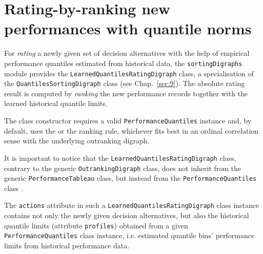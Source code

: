 \section{Rating-by-ranking new performances with quantile norms}
\label{sec:10.3}

For \emph{rating} a newly given set of decision alternatives with the help of empirical performance quantiles estimated from historical data, the \texttt{sortingDigraphs} module provides the \texttt{Learned\-QuantilesRatingDigraph} class, a specialisation of the \texttt{QuantilesSor\-tingDigraph} class (see Chap.~\ref{sec:9}). The absolute rating result is computed by \emph{ranking} the new performance records together with the learned historical quantile limits.

The class constructor requires a valid \texttt{PerformanceQuantiles} instance and, by default, uses the \Copeland or the \NetFlows ranking rule, whichever fits best in an ordinal correlation sense with the underlying outranking digraph.

It is important to notice that the \texttt{LearnedQuantilesRatingDigraph} class, contrary to the generic \texttt{OutrankingDigraph} class, does not inherit from the generic \texttt{PerformanceTableau} class, but instead from the \texttt{Performance\-Quantiles} class \citep{BIS-2021b}.

The \texttt{actions} attribute in such a \texttt{LearnedQuantilesRatingDigraph} class instance contains not only the newly given decision alternatives, but also the historical quantile limits (attribute \texttt{profiles}) obtained from a given \texttt{Perfor\-manceQuantiles} class instance, i.e. estimated quantile bins' performance limits from historical performance data.

